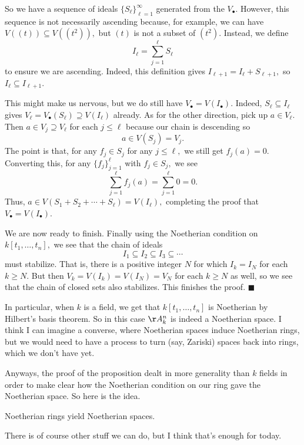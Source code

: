 So we have a sequence of ideals $\{S_\ell\}_{\ell=1}^\infty$ generated from the $V_\bullet.$ However, this sequence is not necessarily ascending because, for example, we can have $V((t))\subseteq V\left(\left(t^2\right)\right),$ but $(t)$ is not a subset of $\left(t^2\right).$ Instead, we define
\[I_\ell=\sum_{j=1}^\ell S_\ell\]
to ensure we are ascending. Indeed, this definition gives $I_{\ell+1}=I_\ell+S_{\ell+1},$ so $I_\ell\subseteq I_{\ell+1}.$ 

This might make us nervous, but we do still have $V_\bullet=V(I_\bullet).$ Indeed, $S_\ell\subseteq I_\ell$ gives $V_\ell=V_\bullet(S_\ell)\supseteq V(I_\ell)$ already. As for the other direction, pick up $a\in V_\ell.$ Then $a\in V_j\supseteq V_\ell$ for each $j\le\ell$ because our chain is descending so
\[a\in V(S_j)=V_j.\]
The point is that, for any $f_j\in S_j$ for any $j\le\ell,$ we still get $f_j(a)=0.$ Converting this, for any $\{f_j\}_{j=1}^\ell$ with $f_j\in S_j,$ we see
\[\sum_{j=1}^\ell f_j(a)=\sum_{j=1}^\ell0=0.\]
Thus, $a\in V(S_1+S_2+\cdots+S_\ell)=V(I_\ell),$ completing the proof that $V_\bullet=V(I_\bullet).$

We are now ready to finish. Finally using the Noetherian condition on $k[t_1,\ldots,t_n],$ we see that the chain of ideals
\[I_1\subseteq I_2\subseteq I_3\subseteq\cdots\]
must stabilize. That is, there is a positive integer $N$ for which $I_k=I_N$ for each $k\ge N.$ But then $V_k=V(I_k)=V(I_N)=V_N$ for each $k\ge N$ as well, so we see that the chain of closed sets also stabilizes. This finishes the proof. $\blacksquare$

In particular, when $k$ is a field, we get that $k[t_1,\ldots,t_n]$ is Noetherian by Hilbert's basis theorem. So in this case $\AA_k^n$ is indeed a Noetherian space. I think I can imagine a converse, where Noetherian spaces induce Noetherian rings, but we would need to have a process to turn (say, Zariski) spaces back into rings, which we don't have yet.

Anyways, the proof of the proposition dealt in more generality than $k$ fields in order to make clear how the Noetherian condition on our ring gave the Noetherian space. So here is the idea.
\begin{idea}
    Noetherian rings yield Noetherian spaces.
\end{idea}
There is of course other stuff we can do, but I think that's enough for today.

